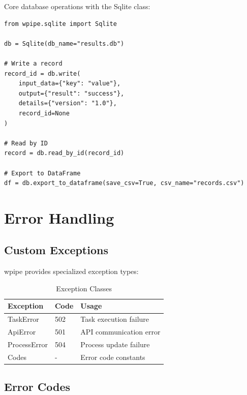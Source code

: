 \documentclass[12pt,a4paper]{report}
\begin{document}
Core database operations with the Sqlite class:

\begin{lstlisting}[caption={SQLite Operations}, label={lst:sqlite-ops}]
from wpipe.sqlite import Sqlite

db = Sqlite(db_name="results.db")

# Write a record
record_id = db.write(
    input_data={"key": "value"},
    output={"result": "success"},
    details={"version": "1.0"},
    record_id=None
)

# Read by ID
record = db.read_by_id(record_id)

# Export to DataFrame
df = db.export_to_dataframe(save_csv=True, csv_name="records.csv")
\end{lstlisting}

\chapter{Error Handling}
\cleardoublepage

\section{Custom Exceptions}

wpipe provides specialized exception types:

\begin{table}[H]
    \centering
    \caption{Exception Classes}
    \label{tab:exceptions}
    \begin{tabular}{lll}
        \toprule
        \textbf{Exception} & \textbf{Code} & \textbf{Usage} \\
        \midrule
        TaskError & 502 & Task execution failure \\
        ApiError & 501 & API communication error \\
        ProcessError & 504 & Process update failure \\
        Codes & - & Error code constants \\
        \bottomrule
    \end{tabular}
\end{table}

\section{Error Codes}
\end{document}

